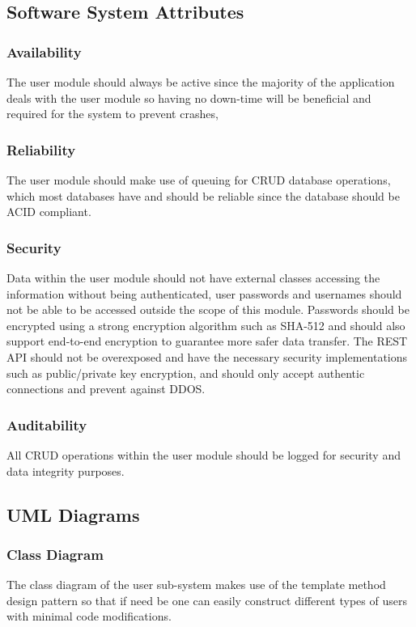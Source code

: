 \subsection{Software System Attributes} %
\subsubsection{Availability}
The user module should always be active since the majority of the application deals with the user module so having no down-time will be beneficial and required for the system to prevent crashes,
\subsubsection{Reliability}
The user module should make use of queuing for CRUD database operations, which most databases have and should be reliable since the database should be ACID compliant.

\subsubsection{Security}
Data within the user module should not have external classes accessing the information without being authenticated, user passwords and usernames should not be able to be accessed outside the scope of this module. Passwords should be encrypted using a strong encryption algorithm such as SHA-512 and should also support end-to-end encryption to guarantee more safer data transfer. The REST API should not be overexposed and have the necessary security implementations such as public/private key encryption, and should only accept authentic connections and prevent against DDOS.

\subsubsection{Auditability}
All CRUD operations within the user module should be logged for security and data integrity purposes.

\subsection{UML Diagrams}
\subsubsection{Class Diagram}
The class diagram of the user sub-system makes use of the template method design pattern so that if need be one can easily construct different types of users with minimal code modifications.

